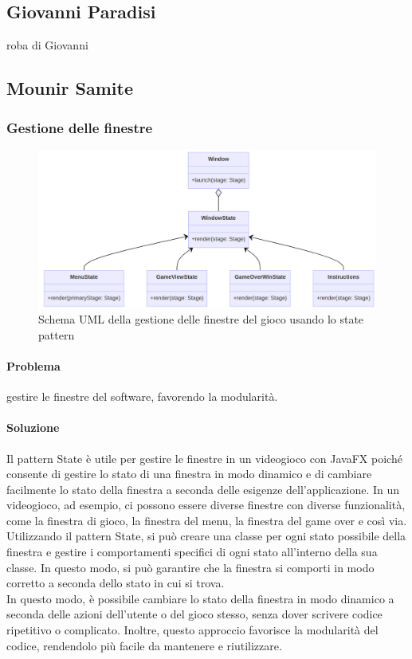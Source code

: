 \documentclass[a4paper,12pt]{report}
\begin{document}
\subsection*{Giovanni Paradisi}
roba di Giovanni
\subsection*{Mounir Samite}
\subsubsection*{Gestione delle finestre}
\begin{figure}[h]
\centering{}
\includegraphics[width=1\textwidth]{img/WindowManagement.png}
\caption{Schema UML della gestione delle finestre del gioco usando lo state pattern}
\end{figure}
\paragraph*{Problema} gestire le finestre del software, favorendo la modularità.
\paragraph*{Soluzione} Il pattern State è utile per gestire le finestre in un videogioco con JavaFX poiché 
consente di gestire lo stato di una finestra in modo dinamico e di cambiare facilmente lo stato della finestra a seconda delle esigenze 
dell'applicazione. In un videogioco, ad esempio, ci possono essere diverse finestre con diverse funzionalità, come la finestra di gioco, 
la finestra del menu, la finestra del game over e così via.
\\
Utilizzando il pattern State, si può creare una classe per ogni stato possibile della finestra e gestire i comportamenti specifici 
di ogni stato all'interno della sua classe. In questo modo, si può garantire che la finestra si comporti
 in modo corretto a seconda dello stato in cui si trova.
 \\
 In questo modo, è possibile cambiare lo stato della finestra in modo dinamico a seconda delle azioni dell'utente o del gioco stesso,
  senza dover scrivere codice ripetitivo o complicato. 
 Inoltre, questo approccio favorisce la modularità del codice, rendendolo più facile da mantenere e riutilizzare.
\end{document}
